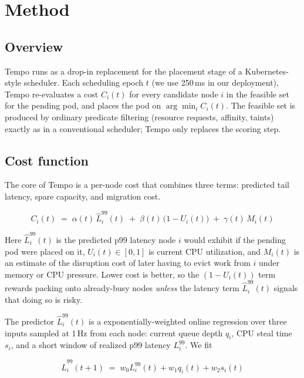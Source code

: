 \section{Method}
\label{sec:method}

\subsection{Overview}

Tempo runs as a drop-in replacement for the placement stage of a
Kubernetes-style scheduler. Each scheduling epoch $t$ (we use 250\,ms in our
deployment), Tempo re-evaluates a cost $C_i(t)$ for every candidate node $i$
in the feasible set for the pending pod, and places the pod on
$\arg\min_i C_i(t)$. The feasible set is produced by ordinary predicate
filtering (resource requests, affinity, taints) exactly as in a conventional
scheduler; Tempo only replaces the scoring step.

\subsection{Cost function}

The core of Tempo is a per-node cost that combines three terms: predicted
tail latency, spare capacity, and migration cost.

\begin{equation}
\label{eq:cost}
C_i(t) \;=\; \alpha(t)\, \hat{L}^{99}_i(t) \;+\; \beta(t)\,\bigl(1 - U_i(t)\bigr) \;+\; \gamma(t)\, M_i(t)
\end{equation}

Here $\hat{L}^{99}_i(t)$ is the predicted p99 latency node $i$ would exhibit
if the pending pod were placed on it, $U_i(t) \in [0,1]$ is current CPU
utilization, and $M_i(t)$ is an estimate of the disruption cost of later
having to evict work from $i$ under memory or CPU pressure. Lower cost is
better, so the $(1 - U_i(t))$ term rewards packing onto already-busy nodes
\emph{unless} the latency term $\hat{L}^{99}_i(t)$ signals that doing so is
risky.

The predictor $\hat{L}^{99}_i(t)$ is a exponentially-weighted online
regression over three inputs sampled at 1\,Hz from each node: current queue
depth $q_i$, CPU steal time $s_i$, and a short window of realized p99
latency $L^{99}_i$. We fit

\begin{equation}
\label{eq:predictor}
\hat{L}^{99}_i(t+1) \;=\; w_0 L^{99}_i(t) + w_1 q_i(t) + w_2 s_i(t)
\end{equation}


